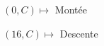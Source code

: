 \documentclass[preview]{standalone}
\begin{document}
\begin{center}
$(0,C) \mapsto$ Montée

$(16,C) \mapsto$ Descente
\end{center}
\end{document}
